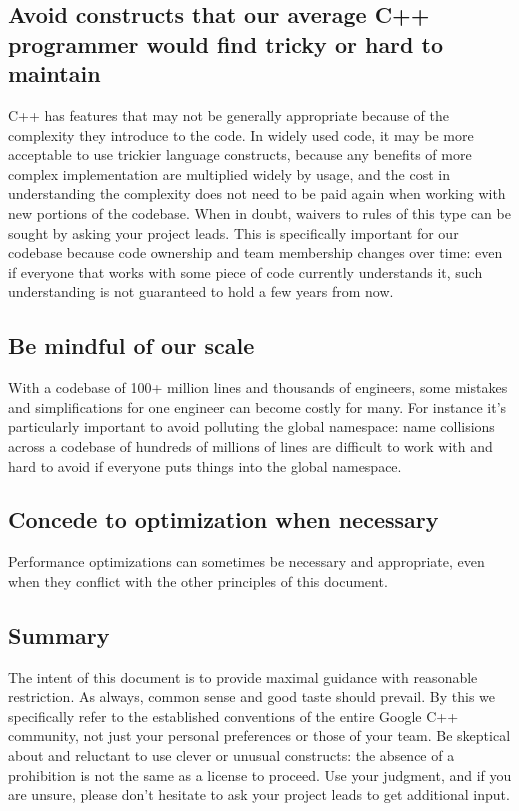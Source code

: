\subsection{Avoid constructs that our average C++ programmer would find tricky or hard to maintain}
C++ has features that may not be generally appropriate because of the complexity they introduce to the code. In widely used code, it may be more acceptable to use trickier language constructs, because any benefits of more complex implementation are multiplied widely by usage, and the cost in understanding the complexity does not need to be paid again when working with new portions of the codebase. When in doubt, waivers to rules of this type can be sought by asking your project leads. This is specifically important for our codebase because code ownership and team membership changes over time: even if everyone that works with some piece of code currently understands it, such understanding is not guaranteed to hold a few years from now.
\subsection{Be mindful of our scale}
With a codebase of 100+ million lines and thousands of engineers, some mistakes and simplifications for one engineer can become costly for many. For instance it's particularly important to avoid polluting the global namespace: name collisions across a codebase of hundreds of millions of lines are difficult to work with and hard to avoid if everyone puts things into the global namespace.
\subsection{Concede to optimization when necessary}
Performance optimizations can sometimes be necessary and appropriate, even when they conflict with the other principles of this document.
\subsection{Summary}
The intent of this document is to provide maximal guidance with reasonable restriction. As always, common sense and good taste should prevail. By this we specifically refer to the established conventions of the entire Google C++ community, not just your personal preferences or those of your team. Be skeptical about and reluctant to use clever or unusual constructs: the absence of a prohibition is not the same as a license to proceed. Use your judgment, and if you are unsure, please don't hesitate to ask your project leads to get additional input.
